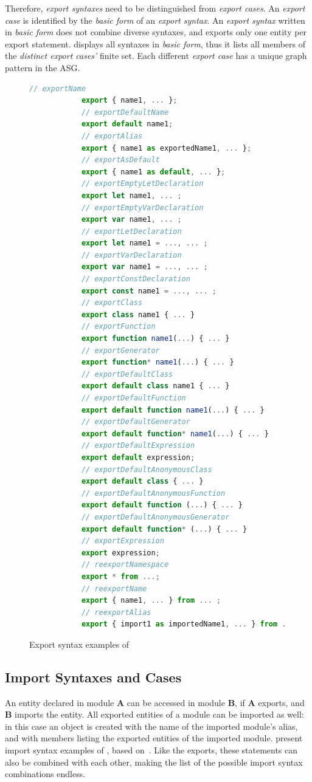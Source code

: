 Therefore, \emph{export syntaxes} need to be distinguished from \emph{export cases}. An \emph{export case} is identified by the \emph{basic form} of an \emph{export syntax}. An \emph{export syntax} written in \emph{basic form} does not combine diverse syntaxes, and exports only one entity per export statement.  displays all syntaxes in \emph{basic form}, thus it lists all members of the \emph{distinct export cases'} finite set. Each different \emph{export case} has a unique graph pattern in the ASG.

\begin{figure}[!p]
	\centering
	\begin{lstlisting}[language=JavaScript]
			// exportName
			export { name1, ... };
			// exportDefaultName
			export default name1;
			// exportAlias
			export { name1 as exportedName1, ... };
			// exportAsDefault
			export { name1 as default, ... };
			// exportEmptyLetDeclaration
			export let name1, ... ;
			// exportEmptyVarDeclaration
			export var name1, ... ;
			// exportLetDeclaration
			export let name1 = ..., ... ;
			// exportVarDeclaration
			export var name1 = ..., ... ;
			// exportConstDeclaration
			export const name1 = ..., ... ;
			// exportClass
			export class name1 { ... }
			// exportFunction
			export function name1(...) { ... }
			// exportGenerator
			export function* name1(...) { ... }
			// exportDefaultClass
			export default class name1 { ... }
			// exportDefaultFunction
			export default function name1(...) { ... }
			// exportDefaultGenerator
			export default function* name1(...) { ... }
			// exportDefaultExpression
			export default expression;
			// exportDefaultAnonymousClass
			export default class { ... }
			// exportDefaultAnonymousFunction
			export default function (...) { ... }
			// exportDefaultAnonymousGenerator
			export default function* (...) { ... }
			// exportExpression
			export expression;
			// reexportNamespace
			export * from ...;
			// reexportName
			export { name1, ... } from ... ;
			// reexportAlias
			export { import1 as importedName1, ... } from ...;
	\end{lstlisting}
  \caption{Export syntax examples of }
  \label{fig:export-syntaxes}
\end{figure}


\subsection{Import Syntaxes and Cases}

An entity declared in module \textbf{A} can be accessed in module \textbf{B}, if \textbf{A} exports, and \textbf{B} imports the entity. All exported entities of a module can be imported as well: in this case an object is created with the name of the imported module's alias, and with members listing the exported entities of the imported module.  present import syntax examples of , based on~\cite{import-syntaxes}. Like the exports, these statements can also be combined with each other, making the list of the possible import syntax combinations endless.

